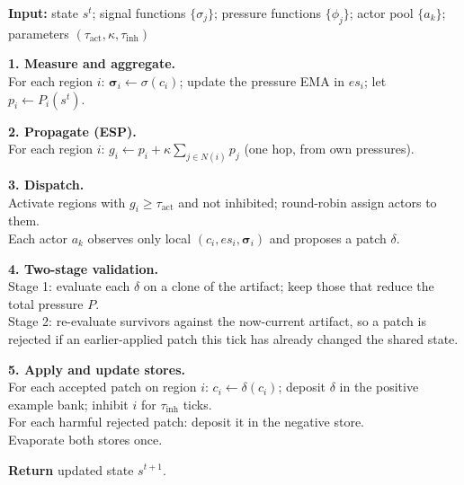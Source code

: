 \begin{algorithm}
\textbf{Input:} state $s^t$; signal functions $\{\sigma_j\}$; pressure functions $\{\phi_j\}$; actor pool $\{a_k\}$; parameters $(\tau_{\text{act}}, \kappa, \tau_{\text{inh}})$

\textbf{1. Measure and aggregate.}\\
\hspace{1em} For each region $i$: $\boldsymbol{\sigma}_i \gets \sigma(c_i)$; update the pressure EMA in $es_i$; let $p_i \gets P_i(s^t)$.

\textbf{2. Propagate (ESP).}\\
\hspace{1em} For each region $i$: $g_i \gets p_i + \kappa \sum_{j \in N(i)} p_j$ \quad (one hop, from own pressures).

\textbf{3. Dispatch.}\\
\hspace{1em} Activate regions with $g_i \geq \tau_{\text{act}}$ and not inhibited; round-robin assign actors to them.\\
\hspace{1em} Each actor $a_k$ observes only local $(c_i, es_i, \boldsymbol{\sigma}_i)$ and proposes a patch $\delta$.

\textbf{4. Two-stage validation.}\\
\hspace{1em} Stage 1: evaluate each $\delta$ on a clone of the artifact; keep those that reduce the total pressure $P$.\\
\hspace{1em} Stage 2: re-evaluate survivors against the now-current artifact, so a patch is rejected if an earlier-applied patch this tick has already changed the shared state.

\textbf{5. Apply and update stores.}\\
\hspace{1em} For each accepted patch on region $i$: $c_i \gets \delta(c_i)$; deposit $\delta$ in the positive example bank; inhibit $i$ for $\tau_{\text{inh}}$ ticks.\\
\hspace{1em} For each harmful rejected patch: deposit it in the negative store.\\
\hspace{1em} Evaporate both stores once.

\textbf{Return} updated state $s^{t+1}$.
\end{algorithm}


